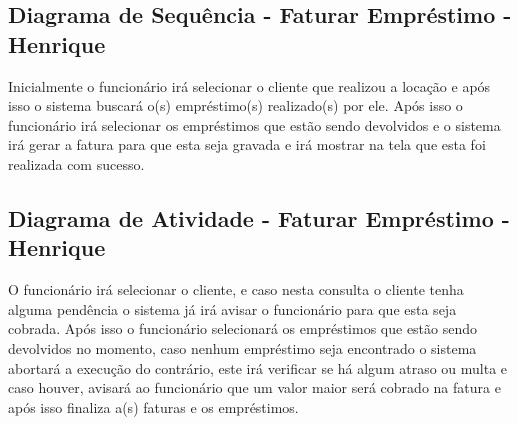 \subsection{ Diagrama de Sequência - Faturar Empréstimo - Henrique}
Inicialmente o funcionário irá selecionar o cliente que realizou a locação e após isso o sistema buscará o(s) empréstimo(s) realizado(s) por ele. Após isso o funcionário irá selecionar os empréstimos que estão sendo devolvidos e o sistema irá gerar a fatura para que esta seja gravada e irá mostrar na tela que esta foi realizada com sucesso.


\subsection{ Diagrama de Atividade - Faturar Empréstimo - Henrique}
O funcionário irá selecionar o cliente, e caso nesta consulta o cliente tenha alguma pendência o sistema já irá avisar o funcionário para que esta seja cobrada. Após isso o funcionário selecionará os empréstimos que estão sendo devolvidos no momento, caso nenhum empréstimo seja encontrado o sistema abortará a execução do contrário, este irá verificar se há algum atraso ou multa e caso houver, avisará ao funcionário que um valor maior será cobrado na fatura e após isso finaliza a(s) faturas e os empréstimos.